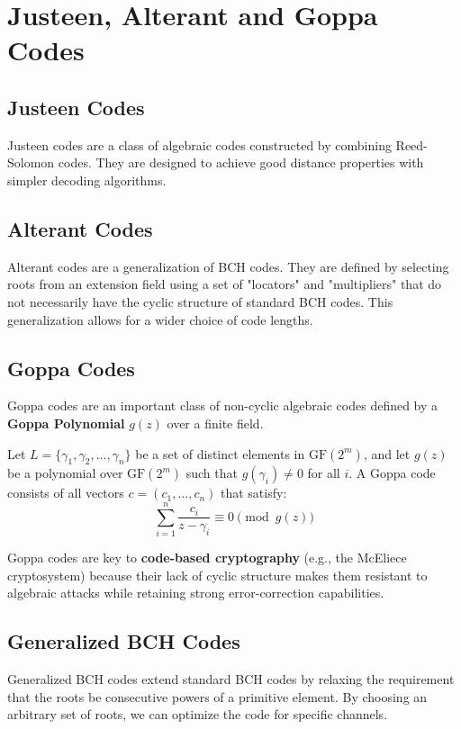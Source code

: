 \documentclass[12pt,a4paper]{article}
\begin{document}
\section{Justeen, Alterant and Goppa Codes}

\subsection{Justeen Codes}
Justeen codes are a class of algebraic codes constructed by combining Reed-Solomon codes. They are designed to achieve good distance properties with simpler decoding algorithms.

\subsection{Alterant Codes}
Alterant codes are a generalization of BCH codes. They are defined by selecting roots from an extension field using a set of "locators" and "multipliers" that do not necessarily have the cyclic structure of standard BCH codes. This generalization allows for a wider choice of code lengths.

\subsection{Goppa Codes}
Goppa codes are an important class of non-cyclic algebraic codes defined by a \textbf{Goppa Polynomial} $g(z)$ over a finite field.
\begin{tcolorbox}[defbox, title={\textbf{Goppa Code Definition}}]
Let $L = \{\gamma_1, \gamma_2, \dots, \gamma_n\}$ be a set of distinct elements in $\text{GF}(2^m)$, and let $g(z)$ be a polynomial over $\text{GF}(2^m)$ such that $g(\gamma_i) \neq 0$ for all $i$. A Goppa code consists of all vectors $c = (c_1, \dots, c_n)$ that satisfy:
\[ \sum_{i=1}^n \frac{c_i}{z - \gamma_i} \equiv 0 \pmod{g(z)} \]
\end{tcolorbox}
Goppa codes are key to \textbf{code-based cryptography} (e.g., the McEliece cryptosystem) because their lack of cyclic structure makes them resistant to algebraic attacks while retaining strong error-correction capabilities.

\subsection{Generalized BCH Codes}
Generalized BCH codes extend standard BCH codes by relaxing the requirement that the roots be consecutive powers of a primitive element. By choosing an arbitrary set of roots, we can optimize the code for specific channels.
\end{document}
